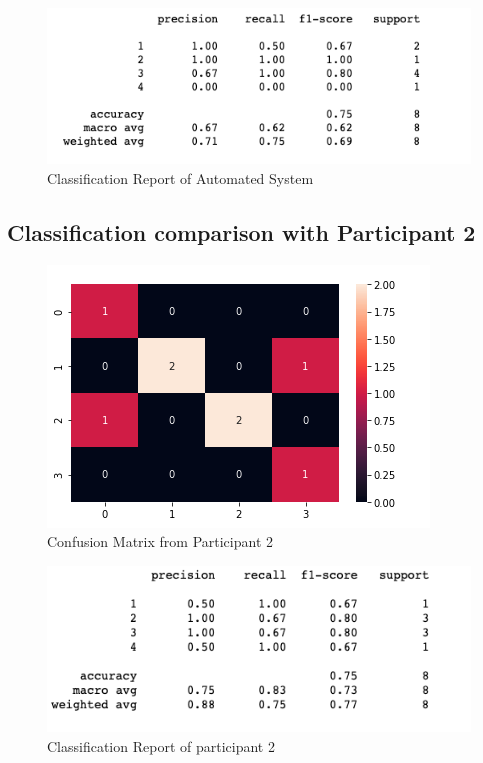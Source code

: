 \begin{figure}[!htp]
    \includegraphics[width=\textwidth]{Images/a1r.png}
    \caption{Classification Report of Automated System}
    \label{fig:f11}
\end{figure}



\pagebreak
\subsection*{Classification comparison with Participant 2 }

\begin{figure}[!htp]
    \includegraphics[width=\textwidth]{Images/p2.png}
    \caption{Confusion Matrix from Participant 2}
    \label{fig:f11}
\end{figure}

\begin{figure}[!htp]
    \includegraphics[width=\textwidth]{Images/p2r.png}
    \caption{Classification Report of participant 2}
    \label{fig:f11}
\end{figure}

